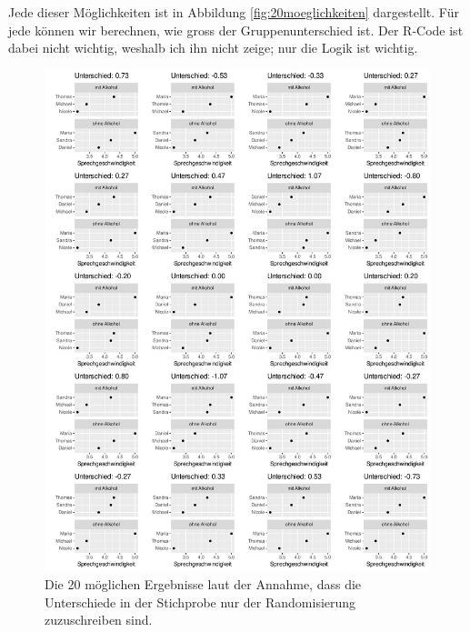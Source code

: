 \documentclass[oneside, 10pt]{book}\usepackage[]{graphicx}\usepackage[]{xcolor}
\newenvironment{knitrout}{}{} %
\begin{document}
Jede dieser Möglichkeiten ist in Abbildung \ref{fig:20moeglichkeiten}
dargestellt. Für jede können wir berechnen, wie gross der
Gruppenunterschied ist. Der R-Code ist dabei nicht wichtig,
weshalb ich ihn nicht zeige; nur die Logik ist wichtig.
\begin{knitrout}
\color{fgcolor}\begin{figure}[tp]

{\centering \includegraphics[width=.8\textwidth]{figs/unnamed-chunk-347-1} 

}

\caption{Die 20 möglichen Ergebnisse laut der Annahme, dass die Unterschiede in der Stichprobe nur der Randomisierung zuzuschreiben sind.\label{fig:20moeglichkeiten}}\label{fig:unnamed-chunk-347}
\end{figure}

\end{knitrout}
\end{document}
